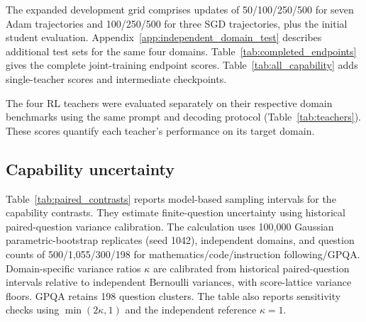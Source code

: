 The expanded development grid comprises updates of 50/100/250/500 for seven Adam trajectories and 100/250/500 for three SGD trajectories, plus the initial student evaluation. Appendix~\ref{app:independent_domain_test} describes additional test sets for the same four domains. Table~\ref{tab:completed_endpoints} gives the complete joint-training endpoint scores. Table~\ref{tab:all_capability} adds single-teacher scores and intermediate checkpoints.



\begin{table}[t]
\caption{\textbf{PG/I64 performance depends on the task and checkpoint.} Mean scores (\%): S is mathematics-only training and M is joint training; both use DR. Joint endpoints appear in Table~\ref{tab:completed_endpoints}.}
\label{tab:all_capability}
\centering\small

\end{table}

The four RL teachers were evaluated separately on their respective domain benchmarks using the same prompt and decoding protocol (Table~\ref{tab:teachers}). These scores quantify each teacher's performance on its target domain.

\begin{table}[t]
\caption{\textbf{Reference scores for the four domain-specific teachers} (\%). Science uses GPQA average@4.}
\label{tab:teachers}
\centering\small

\end{table}

\subsection{Capability uncertainty}
\label{app:capability_uncertainty}

Table~\ref{tab:paired_contrasts} reports model-based sampling intervals for the capability contrasts. They estimate finite-question uncertainty using historical paired-question variance calibration. The calculation uses 100,000 Gaussian parametric-bootstrap replicates (seed 1042), independent domains, and question counts of 500/1,055/300/198 for mathematics/code/instruction following/GPQA. Domain-specific variance ratios $\kappa$ are calibrated from historical paired-question intervals relative to independent Bernoulli variances, with score-lattice variance floors. GPQA retains 198 question clusters. The table also reports sensitivity checks using $\min(2\kappa,1)$ and the independent reference $\kappa=1$.


